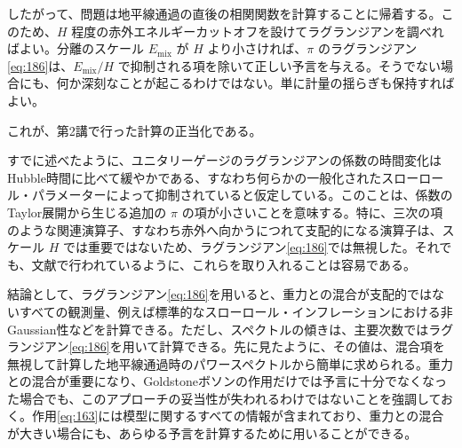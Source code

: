 したがって、問題は地平線通過の直後の相関関数を計算することに帰着する。このため、\(H\) 程度の赤外エネルギーカットオフを設けてラグランジアンを調べればよい。分離のスケール \(E_{\mathrm{mix}}\) が \(H\) より小さければ、\(\pi\) のラグランジアン\eqref{eq:186}は、\(E_{\mathrm{mix}}/H\) で抑制される項を除いて正しい予言を与える。そうでない場合にも、何か深刻なことが起こるわけではない。単に計量の揺らぎも保持すればよい。

これが、第2講で行った計算の正当化である。

すでに述べたように、ユニタリーゲージのラグランジアンの係数の時間変化はHubble時間に比べて緩やかである、すなわち何らかの一般化されたスローロール・パラメーターによって抑制されていると仮定している。このことは、係数のTaylor展開から生じる追加の \(\pi\) の項が小さいことを意味する。特に、三次の項のような関連演算子、すなわち赤外へ向かうにつれて支配的になる演算子は、スケール \(H\) では重要ではないため、ラグランジアン\eqref{eq:186}では無視した。それでも、文献\cite{Behbahani:2011it,Achucarro:2012sm}で行われているように、これらを取り入れることは容易である。

結論として、ラグランジアン\eqref{eq:186}を用いると、重力との混合が支配的ではないすべての観測量、例えば標準的なスローロール・インフレーションにおける非Gaussian性\cite{Maldacena:2002vr,Seery:2006vu}などを計算できる。ただし、スペクトルの傾きは、主要次数ではラグランジアン\eqref{eq:186}を用いて計算できる。先に見たように、その値は、混合項を無視して計算した地平線通過時のパワースペクトルから簡単に求められる。重力との混合が重要になり、Goldstoneボソンの作用だけでは予言に十分でなくなった場合でも、このアプローチの妥当性が失われるわけではないことを強調しておく。作用\eqref{eq:163}には模型に関するすべての情報が含まれており、重力との混合が大きい場合にも、あらゆる予言を計算するために用いることができる。

